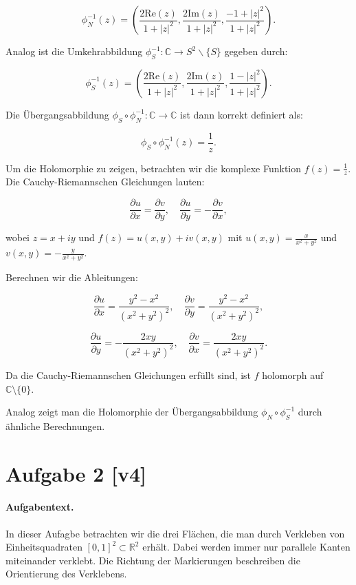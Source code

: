 \documentclass[11pt,a4paper]{article}
\begin{document}
\[
\phi_N^{-1}(z) = \left( \frac{2\text{Re}(z)}{1 + |z|^2}, \frac{2\text{Im}(z)}{1 + |z|^2}, \frac{-1 + |z|^2}{1 + |z|^2} \right).
\]

Analog ist die Umkehrabbildung $\phi_S^{-1}: \mathbb{C} \to S^2 \backslash \{S\}$ gegeben durch:

\[
\phi_S^{-1}(z) = \left( \frac{2\text{Re}(z)}{1 + |z|^2}, \frac{2\text{Im}(z)}{1 + |z|^2}, \frac{1 - |z|^2}{1 + |z|^2} \right).
\]

Die Übergangsabbildung $\phi_S \circ \phi_N^{-1}: \mathbb{C} \to \mathbb{C}$ ist dann korrekt definiert als:

\[
\phi_S \circ \phi_N^{-1}(z) = \frac{1}{z}.
\]

Um die Holomorphie zu zeigen, betrachten wir die komplexe Funktion $f(z) = \frac{1}{z}$. Die Cauchy-Riemannschen Gleichungen lauten:

\[
\frac{\partial u}{\partial x} = \frac{\partial v}{\partial y}, \quad \frac{\partial u}{\partial y} = -\frac{\partial v}{\partial x},
\]

wobei $z = x + iy$ und $f(z) = u(x, y) + iv(x, y)$ mit $u(x, y) = \frac{x}{x^2 + y^2}$ und $v(x, y) = -\frac{y}{x^2 + y^2}$.

Berechnen wir die Ableitungen:

\[
\frac{\partial u}{\partial x} = \frac{y^2 - x^2}{(x^2 + y^2)^2}, \quad \frac{\partial v}{\partial y} = \frac{y^2 - x^2}{(x^2 + y^2)^2},
\]

\[
\frac{\partial u}{\partial y} = -\frac{2xy}{(x^2 + y^2)^2}, \quad \frac{\partial v}{\partial x} = \frac{2xy}{(x^2 + y^2)^2}.
\]

Da die Cauchy-Riemannschen Gleichungen erfüllt sind, ist $f$ holomorph auf $\mathbb{C} \setminus \{0\}$.

Analog zeigt man die Holomorphie der Übergangsabbildung $\phi_N \circ \phi_S^{-1}$ durch ähnliche Berechnungen.


\section*{Aufgabe 2 [v4]}
\paragraph{Aufgabentext.}
In dieser Aufagbe betrachten wir die drei Flächen, die man durch Verkleben von Einheitsquadraten $[0,1]^2 \subset \mathbb{R}^2$ erhält. Dabei werden immer nur parallele Kanten miteinander verklebt. Die Richtung der Markierungen beschreiben die Orientierung des Verklebens.
\end{document}
